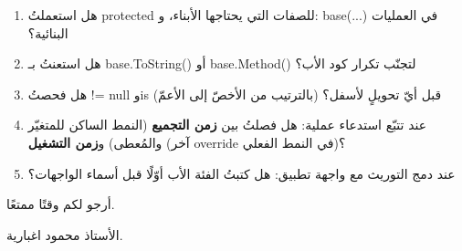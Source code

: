 \documentclass[14pt]{extarticle}
\begin{document}
\filbreak
\begin{boxAttention}
\begin{enumerate}[itemsep=0.2em]
    \item هل استعملتُ \textenglish{protected} للصفات التي يحتاجها الأبناء، و\textenglish{: base(...)} في العمليات البنائية؟
    \item هل استعنتُ بـ \textenglish{base.ToString()} أو \textenglish{base.Method()} لتجنّب تكرار كود الأب؟
    \item هل فحصتُ \textenglish{!= null} و\textenglish{is} (بالترتيب من الأخصّ إلى الأعمّ) قبل أيّ تحويلٍ لأسفل؟
    \item عند تتبّع استدعاء عملية: هل فصلتُ بين \textbf{زمن التجميع} (النمط الساكن للمتغيّر والمُعطى) و\textbf{زمن التشغيل} (آخر \textenglish{override} في النمط الفعلي)؟
    \item عند دمج التوريث مع واجهة تطبيق: هل كتبتُ الفئة الأب أوّلًا قبل أسماء الواجهات؟
\end{enumerate}
\end{boxAttention}

\vspace{0.8cm}
\begin{flushleft}
أرجو لكم وقتًا ممتعًا.

الأستاذ محمود اغبارية.
\end{flushleft}
\end{document}

